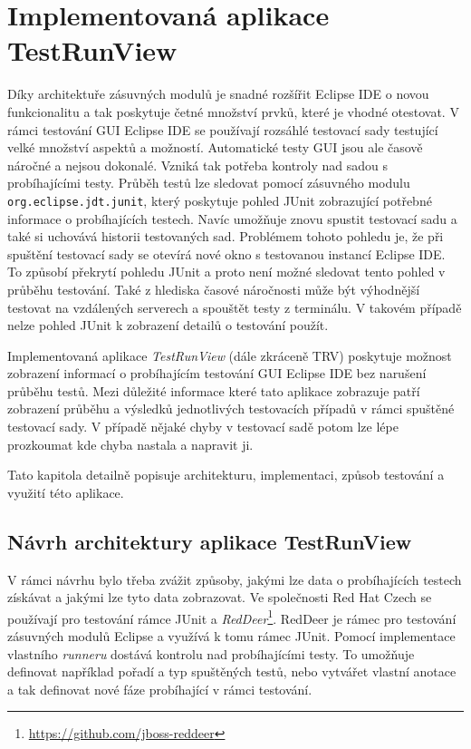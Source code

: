 \chapter{Implementovaná aplikace TestRunView}                             %
Díky architektuře zásuvných modulů je snadné rozšířit Eclipse IDE o novou funkcionalitu a tak poskytuje četné množství prvků, které je vhodné otestovat. V rámci testování GUI Eclipse IDE se používají rozsáhlé testovací sady testující velké množství aspektů a možností. Automatické testy GUI jsou ale časově náročné a nejsou dokonalé. Vzniká tak potřeba kontroly nad sadou s probíhajícími testy. Průběh testů lze sledovat pomocí zásuvného modulu \texttt{org.eclipse.jdt.junit}, který poskytuje pohled JUnit zobrazující potřebné informace o probíhajících testech. Navíc umožňuje znovu spustit testovací sadu a také si uchovává historii testovaných sad. Problémem tohoto pohledu je, že při spuštění testovací sady se otevírá nové okno s testovanou instancí Eclipse IDE. To způsobí překrytí pohledu JUnit a proto není možné sledovat tento pohled v průběhu testování. Také z hlediska časové náročnosti může být výhodnější testovat na vzdálených serverech a spouštět testy z terminálu. V takovém případě nelze pohled JUnit k zobrazení detailů o testování použít.

Implementovaná aplikace \emph{TestRunView} (dále zkráceně TRV) poskytuje možnost zobrazení informací o probíhajícím testování GUI Eclipse IDE bez narušení průběhu testů. Mezi důležité informace které tato aplikace zobrazuje patří zobrazení průběhu a výsledků jednotlivých testovacích případů v rámci spuštěné testovací sady. V případě nějaké chyby v testovací sadě potom lze lépe prozkoumat kde chyba nastala a napravit ji.

Tato kapitola detailně popisuje architekturu, implementaci, způsob testování a využití této aplikace.

  \section{Návrh architektury aplikace TestRunView}
  V rámci návrhu bylo třeba zvážit způsoby, jakými lze data o probíhajících testech získávat a jakými lze tyto data zobrazovat. Ve společnosti Red Hat Czech se používají pro testování rámce JUnit a \textit{RedDeer}\footnote{\url{https://github.com/jboss-reddeer}}. RedDeer je rámec pro testování zásuvných modulů Eclipse a využívá k tomu rámec JUnit. Pomocí implementace vlastního \emph{runneru} dostává kontrolu nad probíhajícími testy. To umožňuje definovat například pořadí a typ spuštěných testů, nebo vytvářet vlastní anotace a tak definovat nové fáze probíhající v rámci testování.

